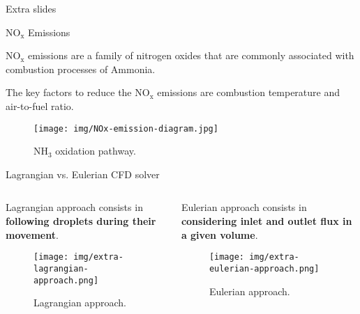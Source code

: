 \begin{frame}[standout]
    Extra slides
\end{frame}



\begin{frame}{$\mathrm{NO_x}$ Emissions}

    $\mathrm{NO_x}$ emissions are a family of nitrogen oxides that are commonly associated with combustion processes of Ammonia.

    The key factors to reduce the $\mathrm{NO_x}$ emissions are combustion temperature and air-to-fuel ratio.

    \begin{figure}[H]
        \centering
        \texttt{[image: img/NOx-emission-diagram.jpg]}
        \caption{$\mathrm{NH_3}$ oxidation pathway.}
    \end{figure}

\end{frame}



\begin{frame}{Lagrangian vs. Eulerian CFD solver}

    \begin{columns}

        \begin{column}{0.5\textwidth}

            Lagrangian approach consists in \textbf{following droplets during their movement}.

            \begin{figure}[H]
                \centering
                \texttt{[image: img/extra-lagrangian-approach.png]}
                \caption{Lagrangian approach.}
            \end{figure}

        \end{column}

        \begin{column}{0.5\textwidth}

            Eulerian approach consists in \textbf{considering inlet and outlet flux in a given volume}.

            \begin{figure}[H]
                \centering
                \texttt{[image: img/extra-eulerian-approach.png]}
                \caption{Eulerian approach.}
            \end{figure}

        \end{column}

    \end{columns}

\end{frame}

